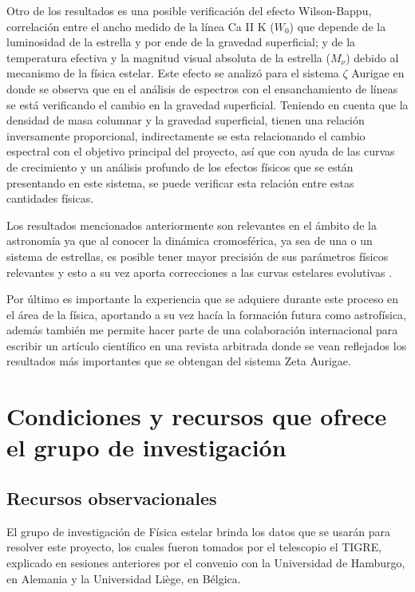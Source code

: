 \documentclass[11pt]{article}
\begin{document}
Otro de los resultados es una posible verificación del efecto Wilson-Bappu, correlación entre el ancho medido de la línea Ca II K ($W_0$) que depende de la luminosidad de la estrella y por ende de la gravedad superficial; y de la temperatura efectiva y la magnitud visual absoluta de la estrella ($M_{\nu}$) debido al mecanismo de la física estelar. Este efecto se analizó para el sistema $\zeta$ Aurigae en \cite{Dani} donde se observa que en el análisis de espectros con el ensanchamiento de líneas se está verificando el cambio en la gravedad superficial. Teniendo en cuenta que la densidad de masa columnar y la gravedad superficial, tienen una relación inversamente proporcional, indirectamente se esta relacionando el cambio espectral con el objetivo principal del proyecto, así que con ayuda de las curvas de crecimiento y un análisis profundo de los efectos físicos que se están presentando en este sistema, se puede verificar esta relación entre estas cantidades físicas.

\noindent Los resultados mencionados anteriormente son relevantes en el ámbito de la astronomía ya que al conocer la dinámica cromosférica, ya sea de una o un sistema de estrellas, es posible tener mayor precisión de sus parámetros físicos relevantes y esto a su vez aporta correcciones a las curvas estelares evolutivas \cite{pols1998stellar}.  

Por último es importante la experiencia que se adquiere durante este proceso en el área de la física, aportando a su vez hacía la formación futura como astrofísica, además también me permite hacer parte de una colaboración internacional para escribir un artículo científico en una revista arbitrada donde se vean reflejados los resultados más importantes que se obtengan del sistema Zeta Aurigae.




\section{Condiciones y recursos que ofrece el grupo de investigación}
\subsection{Recursos observacionales}
El grupo de investigación de Física estelar brinda los datos que se usarán para resolver este proyecto, los cuales fueron tomados por el telescopio el TIGRE, explicado en sesiones anteriores por el convenio con la Universidad de Hamburgo, en Alemania y la Universidad Liège, en Bélgica. 
\end{document}
